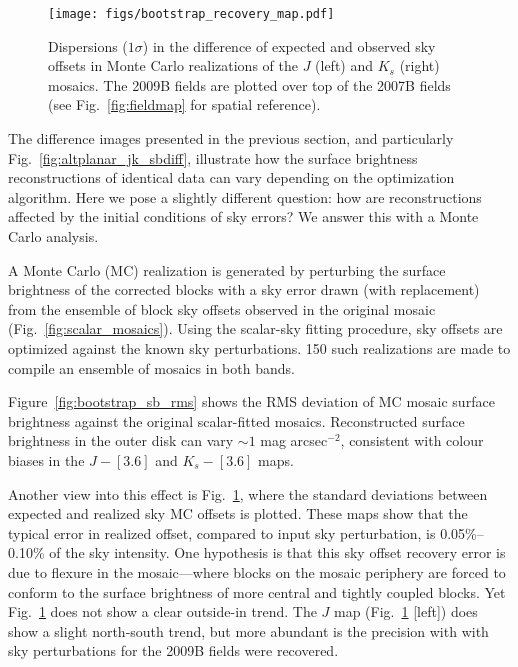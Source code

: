 \documentclass[iop]{emulateapj}
\newcommand{\Fig}[1]{Fig.~\ref{fig:#1}}  %
\begin{document}
\begin{figure}[t]
\centering
\texttt{[image: figs/bootstrap\_recovery\_map.pdf]}
\caption{Dispersions ($1\sigma$) in the difference of expected and observed sky offsets in Monte Carlo realizations of the $J$ (left) and $K_s$ (right) mosaics.
The 2009B fields are plotted over top of the 2007B fields (see \Fig{fieldmap} for spatial reference).}
\label{fig:bootstrap_recovery_map}
\end{figure}


The difference images presented in the previous section, and particularly \Fig{altplanar_jk_sbdiff}, illustrate how the surface brightness reconstructions of identical data can vary depending on the optimization algorithm.
Here we pose a slightly different question: how are reconstructions affected by the initial conditions of sky errors? We answer this with a Monte Carlo analysis.

A Monte Carlo (MC) realization is generated by perturbing the surface brightness of the corrected blocks with a sky error drawn (with replacement) from the ensemble of block sky offsets observed in the original mosaic (\Fig{scalar_mosaics}).
Using the scalar-sky fitting procedure, sky offsets  are optimized against the known sky perturbations.
150 such realizations are made to compile an ensemble of mosaics in both bands.

Figure~\ref{fig:bootstrap_sb_rms} shows the RMS deviation of MC mosaic surface brightness against the original scalar-fitted mosaics. Reconstructed surface brightness in the outer disk can vary $\sim 1$ mag arcsec$^{-2}$, consistent with colour biases in the $J-[3.6]$ and $K_s-[3.6]$ maps.

Another view into this effect is \Fig{bootstrap_recovery_map}, where the standard deviations between expected and realized sky MC offsets is plotted.
These maps show that the typical error in realized offset, compared to input sky perturbation, is 0.05\%--0.10\% of the sky intensity.
One hypothesis is that this sky offset recovery error is due to flexure in the mosaic---where blocks on the mosaic periphery are forced to conform to the surface brightness of more central and tightly coupled blocks.
Yet \Fig{bootstrap_recovery_map} does not show a clear outside-in trend.
The $J$ map (\Fig{bootstrap_recovery_map} [left]) does show a slight north-south trend, but more abundant is the precision with with sky perturbations for the 2009B fields were recovered.
\end{document}
